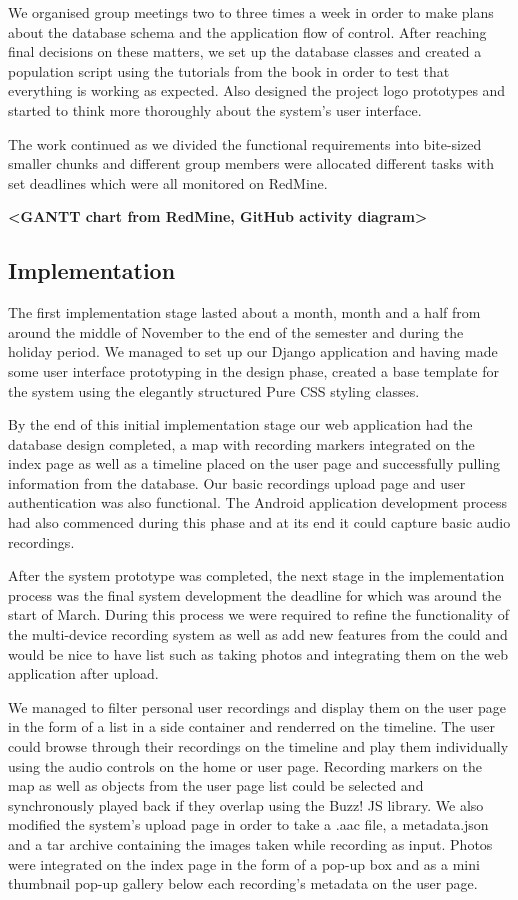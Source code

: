\documentclass{l3proj}
\begin{document}
We organised group meetings two to three times a week in order to make plans about the database schema and the application flow of control. After reaching final decisions on these matters, we set up the database classes and created a population script using the tutorials from the book in order to test that everything is working as expected. Also designed the project logo prototypes and started to think more thoroughly about the system's user interface.

The work continued as we divided the functional requirements into bite-sized smaller chunks and different group members were allocated different tasks with set deadlines which were all monitored on RedMine.

\textbf{<GANTT chart from RedMine, GitHub activity diagram>}

\subsection{Implementation}

The first implementation stage lasted about a month, month and a half from around the middle of November to the end of the semester and during the holiday period.
 We managed to set up our Django application and having made some user interface prototyping in the design phase, created a base template for the system using the elegantly structured Pure CSS styling classes.
 
By the end of this initial implementation stage our web application had the database design completed, a map with recording markers integrated on the index page as well as a timeline placed on the user page and successfully pulling information from the database.
 Our basic recordings upload page and user authentication was also functional. The Android application development process had also commenced during this phase and at its end it could capture basic audio recordings.
 
After the system prototype was completed, the next stage in the implementation process was the final system development the deadline for which was around the start of March.
 During this process we were required to refine the functionality of the multi-device recording system as well as add new features
 from the could and would be nice to have list such as taking photos and integrating them on the web application after upload.
 
 We managed to filter personal user recordings and display them on the user page in the form of a list in a side container and renderred on the timeline.
 The user could browse through their recordings on the timeline and play them individually using the audio controls on the home or user page.
 Recording markers on the map as well as objects from the user page list could be selected and synchronously played back if they overlap using the Buzz! JS library.
 We also modified the system's upload page in order to take a .aac file, a metadata.json and a tar archive containing the images taken while recording as input.
 Photos were integrated on the index page in the form of a pop-up box and as a mini thumbnail pop-up gallery below each recording's metadata on the user page.
\end{document}
